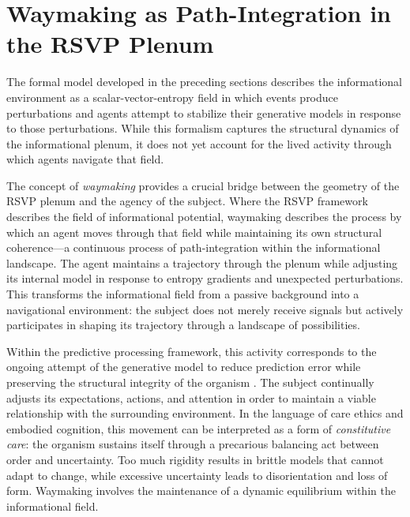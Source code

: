 \documentclass[12pt,a4paper]{article}
\begin{document}
\section{Waymaking as Path-Integration in the RSVP Plenum}

The formal model developed in the preceding sections describes the informational environment
as a scalar-vector-entropy field in which events produce perturbations and agents attempt to
stabilize their generative models in response to those perturbations. While this formalism
captures the structural dynamics of the informational plenum, it does not yet account for the
lived activity through which agents navigate that field.

The concept of \emph{waymaking} provides a crucial bridge between the geometry of the RSVP
plenum and the agency of the subject. Where the RSVP framework describes the field of
informational potential, waymaking describes the process by which an agent moves through that
field while maintaining its own structural coherence---a continuous process of path-integration
within the informational landscape. The agent maintains a trajectory through the plenum while
adjusting its internal model in response to entropy gradients and unexpected perturbations.
This transforms the informational field from a passive background into a navigational
environment: the subject does not merely receive signals but actively participates in shaping
its trajectory through a landscape of possibilities.

Within the predictive processing framework, this activity corresponds to the ongoing attempt
of the generative model to reduce prediction error while preserving the structural integrity
of the organism \citep{friston2010}. The subject continually adjusts its expectations, actions,
and attention in order to maintain a viable relationship with the surrounding environment.
In the language of care ethics and embodied cognition, this movement can be interpreted as a
form of \emph{constitutive care}: the organism sustains itself through a precarious balancing
act between order and uncertainty. Too much rigidity results in brittle models that cannot
adapt to change, while excessive uncertainty leads to disorientation and loss of form.
Waymaking involves the maintenance of a dynamic equilibrium within the informational field.
\end{document}
